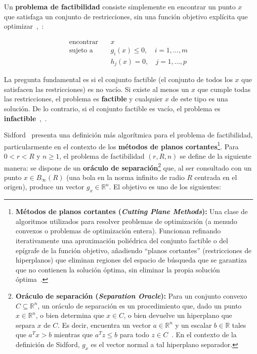 Un \textbf{problema de factibilidad} consiste simplemente en encontrar un punto $x$ que satisfaga un conjunto de
restricciones, sin una función objetivo explícita que optimizar~\cite[p.~130]{BoydVandenberghe2004},~\cite[p.~1]{Sidford2020}:

\begin{align}
  \text{encontrar} \quad & x \\
  \text{sujeto a} \quad  & g_i(x) \leq 0, \quad i = 1, \dots, m \\
                       & h_j(x) = 0,    \quad j = 1, \dots, p
\end{align}

La pregunta fundamental es si el conjunto factible (el conjunto de todos los $x$ que satisfacen las restricciones)
es no vacío. Si existe al menos un $x$ que cumple todas las restricciones, el problema es \textbf{factible} y cualquier
$x$ de este tipo es una solución. De lo contrario, si el conjunto factible es vacío, el problema es \textbf{infactible}~\cite[p.~129]{BoydVandenberghe2004},~\cite[p.~94]{BoydVandenbergheSlides2023}.

Sidford~\cite[p.~2]{Sidford2020} presenta una definición más algorítmica para el problema de factibilidad, particularmente
en el contexto de los \textbf{métodos de planos cortantes}\footnote{\textbf{Métodos de planos cortantes
(\textit{Cutting Plane Methods}):} Una clase de algoritmos utilizados para resolver problemas de optimización (a menudo
convexos o problemas de optimización entera). Funcionan refinando iterativamente una aproximación poliédrica del conjunto
factible o del epígrafe de la función objetivo, añadiendo ``planos cortantes'' (restricciones de hiperplanos) que eliminan
regiones del espacio de búsqueda que se garantiza que no contienen la solución óptima, sin eliminar la propia solución óptima~\cite[p.~1]{Sidford2020}.}. Para $0 < r < R$ y $n \geq 1$, el problema de factibilidad $(r, R, n)$ se define de la
siguiente manera: se dispone de un \textbf{oráculo de separación}\footnote{\textbf{Oráculo de separación
(\textit{Separation Oracle}):} Para un conjunto convexo $C \subseteq \mathbb{R}^n$, un oráculo de separación es un
procedimiento que, dado un punto $x \in \mathbb{R}^n$, o bien determina que $x \in C$, o bien devuelve un hiperplano
que separa $x$ de $C$. Es decir, encuentra un vector $a \in \mathbb{R}^n$ y un escalar $b \in \mathbb{R}$ tales que
$a^T x > b$ mientras que $a^T z \leq b$ para todo $z \in C$~\cite[p.~1]{Sidford2020}. En el contexto de la definición
de Sidford, $g_x$ es el vector normal a tal hiperplano separador.} que, al ser consultado con un punto $x \in B_\infty(R)$
(una bola en la norma infinito de radio $R$ centrada en el origen), produce un vector $g_x \in \mathbb{R}^n$.
El objetivo es uno de los siguientes:

